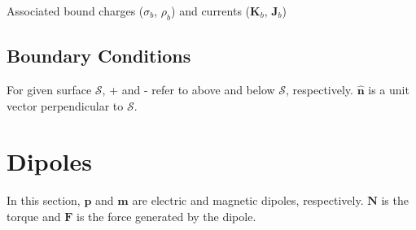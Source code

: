 \noindent
Associated bound charges ($\sigma_b$, $\rho_b$) and currents ($\mathbf{K}_b$, $\mathbf{J}_b$) 

\subsection{Boundary Conditions}
For given surface $\mathcal{S}$, + and - refer to above and below
$\mathcal{S}$, respectively. $\hat{\textbf{n}}$ is a unit vector
perpendicular to $\mathcal{S}$. \\


\section{Dipoles}
In this section, $\textbf{p}$ and $\textbf{m}$ are electric and
magnetic dipoles, respectively.  $\textbf{N}$ is the torque and
$\textbf{F}$ is the force generated by the dipole.

